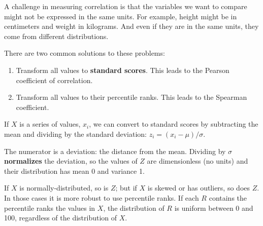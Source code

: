 \documentclass[12pt]{book}
\begin{document}

A challenge in measuring correlation is that the variables we want
to compare might not be expressed in the same units.  For example, height
might be in centimeters and weight in kilograms.  And even if they are
in the same units, they come from different distributions.


There are two common solutions to these problems:

\begin{enumerate}

\item Transform all values to {\bf standard scores}.  This leads to
the Pearson coefficient of correlation.



\item Transform all values to their percentile ranks.  This
leads to the Spearman coefficient.


\end{enumerate}

If $X$ is a series of values, $x_i$, we can convert to standard
scores by subtracting the mean and dividing by the standard deviation:
$z_i = (x_i - \mu) / \sigma$.


The numerator is a deviation: the distance from the mean.  Dividing by
$\sigma$ {\bf normalizes} the deviation, so the values of $Z$ are
dimensionless (no units) and their distribution has mean 0 and
variance 1.



If $X$ is normally-distributed, so is $Z$; but if $X$ is skewed or has
outliers, so does $Z$.  In those cases it is more robust to use
percentile ranks.  If each $R$ contains the percentile ranks the
values in $X$, the distribution of $R$ is uniform between 0 and 100,
regardless of the distribution of $X$.

\end{document}
